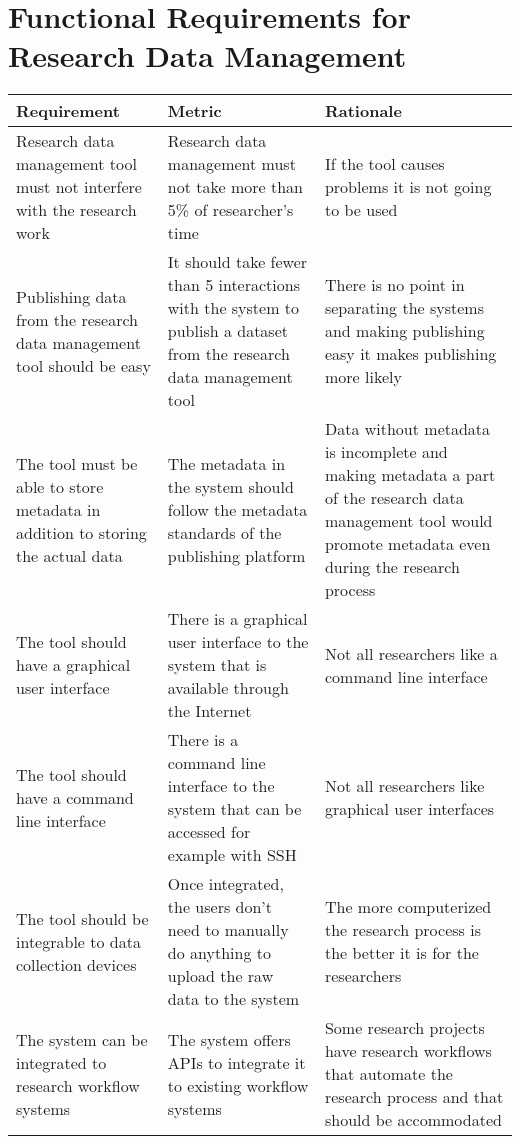 \pagebreak

\section[Research Data Management]{Functional Requirements for Research Data Management}

\tabcolsep=0.11cm
\begin{tabularx}{\textwidth}{| >{\raggedright}p{3cm} | >{\raggedright}p{3cm} | X |}
    \hline
    \textbf{Requirement} & \textbf{Metric}& \textbf{Rationale} \\
    \hline
    \rowcolor{Gray}
    Research data management tool must not interfere with the research work    &Research data management must not take more than 5\% of researcher’s time & If the tool causes problems it is not going to be used\\
    \hline
    Publishing data from the research data management tool should be easy&It should take fewer than 5 interactions with the system to publish a dataset from the research data management tool &There is no point in separating the systems and making publishing easy it makes publishing more likely\\
    \hline
    \rowcolor{Gray}
    The tool must be able to store metadata in addition to storing the actual data  &The metadata in the system should follow the metadata standards of the publishing platform&Data without metadata is incomplete and making metadata a part of the research data management tool would promote metadata even during the research process\\
    \hline
    The tool should have a graphical user interface  &There is a graphical user interface to the system that is available through the Internet & Not all researchers like a command line interface\\
    \hline
    \rowcolor{Gray}
    The tool should have a command line interface        &There is a command line interface to the system that can be accessed for example with SSH & Not all researchers like graphical user interfaces\\
    \hline
    The tool should be integrable to data collection devices  & Once integrated, the users don’t need to manually do anything to upload the raw data to the system & The more computerized the research process is the better it is for the researchers\\
    \hline
    \rowcolor{Gray}
    The system can be integrated to research workflow systems   &The system offers APIs to integrate it to existing workflow systems& Some research projects have research workflows that automate the research process and that should be accommodated\\

\end{tabularx}
